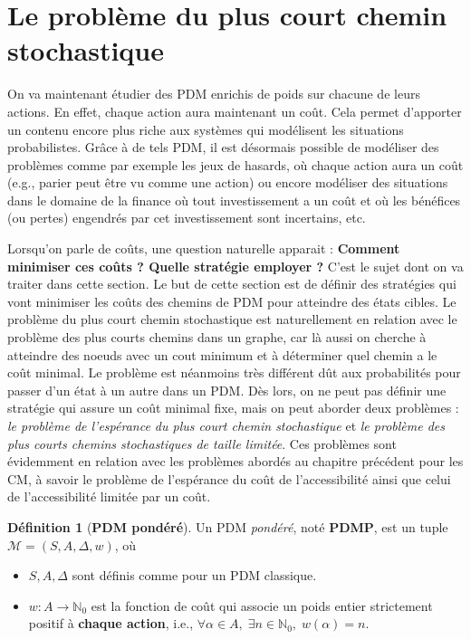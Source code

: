\documentclass[12pt,a4paper]{report}
\theoremstyle{definition}%
\newtheorem{definition}{Définition}[chapter]
\theoremstyle{remark}
\let\labelitemi\labelitemii
\begin{document}
\section{Le problème du plus court chemin stochastique}
On va maintenant étudier des PDM enrichis de poids sur chacune de leurs
actions. En effet, chaque action aura maintenant un coût. Cela permet
d'apporter un contenu encore plus riche aux systèmes qui modélisent les
situations probabilistes. Grâce à de tels PDM, il est désormais possible de modéliser
des problèmes comme par exemple les jeux de hasards, où chaque action aura un coût (e.g., parier peut être vu comme une action) ou encore
modéliser des situations dans le domaine de la finance où tout investissement
a un coût et où les bénéfices (ou pertes) engendrés par cet investissement sont
incertains, etc.
\par
Lorsqu'on parle de coûts, une question naturelle apparait :
\textbf{Comment minimiser ces coûts ? Quelle stratégie employer ?} C'est
le sujet dont on va traiter dans cette section.
Le but de cette section est de définir des stratégies qui vont minimiser les
coûts des chemins de PDM pour atteindre des états cibles.
Le problème du plus court
chemin stochastique est naturellement en relation avec le problème des plus
courts chemins dans un graphe, car là aussi on cherche à atteindre des noeuds
avec un cout minimum et à déterminer quel chemin a le coût minimal. Le problème est néanmoins très différent dût aux
probabilités pour passer d'un état à un autre dans un PDM. Dès lors, on ne
peut pas définir une stratégie qui assure un coût minimal fixe, mais on peut
aborder deux problèmes :
\textit{le problème de l'espérance du plus court chemin stochastique} et
\textit{le problème des plus courts chemins stochastiques de taille limitée}.
Ces problèmes sont évidemment en relation avec les problèmes abordés au
chapitre précédent pour les CM, à savoir le problème de l'espérance du coût de l'accessibilité ainsi
que celui de l'accessibilité limitée par un coût.

\begin{definition}[\textbf{PDM pondéré}]
	Un PDM \textit{pondéré}, noté \textbf{PDMP}, est un tuple \\$\mathcal{M} = (S, A, \Delta, w)$, où
	\begin{itemize}
		\renewcommand{\labelitemi}{\tiny$\bullet$}
		\item $S, A, \Delta$ sont définis comme pour un PDM classique.
		\item $w : A \rightarrow \mathbb{N}_0$ est la fonction de coût qui
			associe un poids entier strictement positif à \textbf{chaque action}, i.e.,
			$\forall \alpha \in A,\; \exists n \in \mathbb{N}_0, \; w(\alpha) = n$.
	\end{itemize}
\end{definition}
\end{document}
